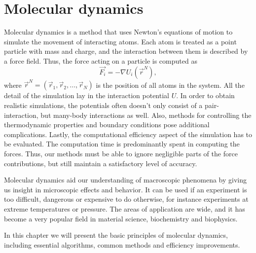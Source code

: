 \documentclass[twoside,english]{uiofysmaster}
\begin{document}
\chapter{Molecular dynamics}
Molecular dynamics is a method that uses Newton’s equations of motion to simulate the movement of interacting atoms. 
Each atom is treated as a point particle with mass and charge, and the interaction between them is described by a force field. 
Thus, the force acting on a particle is computed as
\begin{equation}
	\vec{F_i} = -\nabla U_i(\vec{r}^N), \label{MDForce}
\end{equation} 
where $\vec{r}^N=(\vec{r}_1, \vec{r}_2, \dots, \vec{r}_N)$ is the position of all atoms in the system. 
All the detail of the simulation lay in the interaction potential $U$.
In order to obtain realistic simulations, the potentials often doesn't only consist of a pair-interaction, but many-body interactions as well.
Also, methods for controlling the thermodynamic properties and boundary conditions pose additional complications.
Lastly, the computational efficiency aspect of the simulation has to be evaluated. 
The computation time is predominantly spent in computing the forces. 
Thus, our methods must be able to ignore negligible parts of the force contributions, but still maintain a satisfactory level of accuracy. 


Molecular dynamics aid our understanding of macroscopic phenomena by giving us insight in microscopic effects and behavior. 
It can be used if an experiment is too difficult, dangerous or expensive to do otherwise, for instance experiments at extreme temperatures or pressure. 
The areas of application are wide, and it has become a very popular field in material science, biochemistry and biophysics.

In this chapter we will present the basic principles of molecular dynamics, including essential algorithms, common methods and efficiency improvements.

\end{document}
